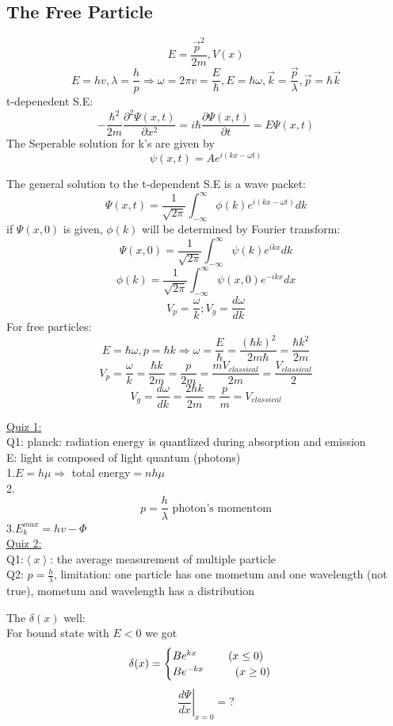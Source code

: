 \documentclass[12pt, a4paper]{article}
\newcommand{\tab}[1][1cm]{\hspace*{#1}}
\begin{document}
\subsection{The Free Particle}
$$E=\frac{\vec{p}^2}{2m}, V(x)$$
$$E=hv,\lambda=\frac{h}{p}\Rightarrow\omega=2\pi v = \frac{E}{\hbar}, E = \hbar \omega, \vec{k}=\frac{\vec{p}}{\lambda}, \vec{p}=\hbar\vec{k}$$
t-depenedent S.E:
$$-\frac{\hbar^2}{2m}\frac{\partial ^2 \Psi(x,t)}{\partial x^2}=i\hbar\frac{\partial \Psi(x,t)}{\partial t}=E\Psi(x,t)$$
The Seperable solution for k's are given by $$\psi(x,t)=Ae^{i(kx-\omega t)}$$

The general solution to the t-dependent S.E is a wave packet:
$$\Psi(x,t)=\frac{1}{\sqrt{2\pi}}\int_{-\infty}^{\infty}\phi(k)e^{i(kx-\omega t)}dk$$
if $\Psi(x,0)$ is given, $\phi(k)$ will be determined by Fourier transform:
$$\Psi(x,0)=\frac{1}{\sqrt{2\pi}}\int_{-\infty}^{\infty}\psi(k)e^{ikx}dk$$
$$\phi(k)=\frac{1}{\sqrt{2\pi}}\int_{-\infty}^{\infty}\psi(x,0)e^{-ikx}dx$$
$$V_p=\frac{\omega}{k};V_g=\frac{d\omega}{dk}$$
For free particles: $$E=\hbar \omega, p=\hbar k\Rightarrow \omega = \frac{E}{\hbar}=\frac{(\hbar k)^2}{2m\hbar}=\frac{\hbar k^2}{2m}$$
$$V_p=\frac{\omega}{k}=\frac{\hbar k}{2m}=\frac{p}{2m}=\frac{m V_{classical}}{2m}=\frac{V_{classical}}{2}$$
$$V_g=\frac{d\omega}{dk}=\frac{2\hbar k}{2m}=\frac{p}{m}=V_{classical}$$


\underline{Quiz 1:}\\
Q1: planck: radiation energy is quantlized during absorption and emission\\
\tab 	E: light is composed of light quantum (photons) \\
1.$E=h\mu\Rightarrow$ total energy$=nh\mu$\\
2.$$p=\frac{h}{\lambda} \text{ photon's momentom}$$
3.$E_k^{max} = hv-\Phi$\\
\underline{Quiz 2:}\\
Q1:$\left<x\right>$: the average measurement of multiple particle \\
Q2: $p=\frac{h}{\lambda}$, limitation: one particle has one mometum and one wavelength (not true), mometum and wavelength has a distribution

The $\delta(x)$ well:\\
For bound state with $E< 0$ we got
$$
\delta(x)=
\begin{cases}
Be^{kx}\tab (x \leq 0)\\
Be^{-kx} \tab (x \geq 0)
\end{cases}
$$
$$\left.\frac{d\Psi}{dx}\right \vert_{x=0}=?$$
\end{document}
